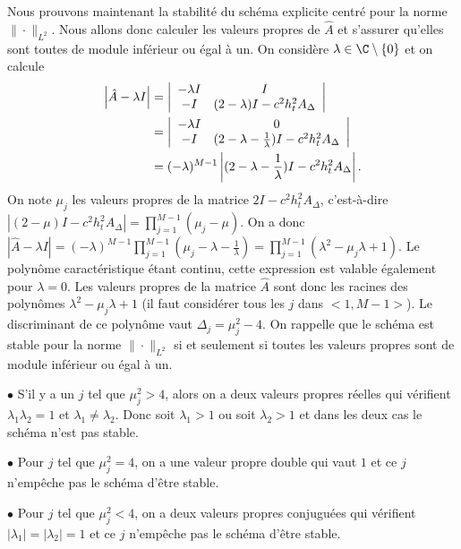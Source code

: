 \documentclass[12pt,a4paper,twoside]{article}
\begin{document}
Nous prouvons maintenant la stabilit\'e du sch\'ema explicite centr\'e
pour la norme $\| \cdot \|_{L^2}$.
Nous allons donc calculer les valeurs propres de $\hat{A}$ et s'assurer qu'elles sont toutes
de module inf\'erieur ou \'egal \`a un.
On consid\`ere $\lambda \in \C \setminus \{ 0 \}$ et on calcule
\begin{align*}
  \left|
  \hat{A} - \lambda I
  \right|
  &=
  \left|
  \begin{array}{c c}
    - \lambda I
    & I
    \\
    - I
    & (2-\lambda) I - c^2 h_t^2 A_{\Delta}
  \end{array}
  \right|
  \\
  &=
  \left|
  \begin{array}{c c}
    - \lambda I
    & 0
    \\
    - I
    & (2-\lambda - \frac{1}{\lambda}) I - c^2 h_t^2 A_{\Delta}
  \end{array}
  \right|
  \\
  &= (-\lambda)^{M-1}
  \left|
    (2-\lambda - \frac{1}{\lambda}) I - c^2 h_t^2 A_{\Delta}
  \right| .
\end{align*}
On note $\mu_j$ les valeurs propres de la matrice $2I - c^2h_t^2 A_{\Delta}$, c'est-\`a-dire
$| (2-\mu) I - c^2 h_t^2 A_{\Delta} | = \prod_{j=1}^{M-1} (\mu_j - \mu)$.
On a donc
$|\hat{A} - \lambda I| = (-\lambda)^{M-1} \prod_{j=1}^{M-1} (\mu_j - \lambda - \frac{1}{\lambda})
= \prod_{j=1}^{M-1} (\lambda^2 - \mu_j \lambda + 1)$.
Le polyn\^ome caract\'eristique \'etant continu, cette expression
est valable \'egalement pour $\lambda = 0$.
Les valeurs propres de la matrice $\hat{A}$ sont donc les racines des polyn\^omes
$\lambda^2 - \mu_j \lambda + 1$ (il faut consid\'erer tous les $j$ dans $<1,M-1>$).
Le discriminant de ce polyn\^ome vaut $\Delta_j = \mu_j^2 - 4$.
On rappelle que le sch\'ema est stable pour la norme $\| \cdot \|_{L^2}$
si et seulement si toutes les valeurs propres sont de module inf\'erieur ou \'egal \`a un.


$\bullet$ S'il y a un $j$ tel que $\mu_j^2 > 4$, alors on a deux valeurs propres r\'eelles
qui v\'erifient $\lambda_1 \lambda_2 = 1$ et $\lambda_1 \neq \lambda_2$.
Donc soit $\lambda_1 > 1$ ou soit $\lambda_2 > 1$ et dans les deux cas le sch\'ema n'est pas stable.

$\bullet$ Pour $j$ tel que $\mu_j^2 = 4$, on a une valeur propre double qui vaut $1$
et ce $j$ n'emp\^eche pas le sch\'ema d'\^etre stable.

$\bullet$ Pour $j$ tel que $\mu_j^2 < 4$, on a deux valeurs propres conjugu\'ees qui v\'erifient
$|\lambda_1| = |\lambda_2| = 1$
et ce $j$ n'emp\^eche pas le sch\'ema d'\^etre stable.
\end{document}
